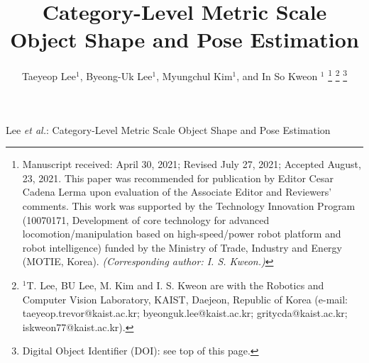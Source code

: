\documentclass[letterpaper, 10 pt, journal, twoside]{IEEEtran}
\begin{document}
\title{\LARGE \bf
Category-Level Metric Scale Object Shape and Pose Estimation}


\author{Taeyeop Lee$^{1}$, Byeong-Uk Lee$^{1}$, Myungchul Kim$^{1}$, and In So Kweon $^{1}$%
\thanks{
Manuscript received: April 30, 2021; Revised July 27, 2021; Accepted August, 23, 2021.
This paper was recommended for publication by Editor Cesar Cadena Lerma upon evaluation of the Associate Editor and 
Reviewers’ comments.
This work was supported by the Technology Innovation Program (10070171, Development of core technology for advanced locomotion/manipulation based on high-speed/power robot platform and robot intelligence) funded by the Ministry of Trade, Industry and Energy (MOTIE, Korea). \textit{(Corresponding author: I. S. Kweon.)}
}
\thanks{$^{1}$T. Lee, BU Lee, M. Kim and I. S. Kweon are with the Robotics and Computer Vision Laboratory, KAIST, Daejeon, Republic of Korea (e-mail: taeyeop.trevor@kaist.ac.kr; byeonguk.lee@kaist.ac.kr; gritycda@kaist.ac.kr; iskweon77@kaist.ac.kr).
}
\thanks{Digital Object Identifier (DOI): see top of this page.}
}


{Lee \MakeLowercase{\textit{et al.}}: Category-Level Metric Scale Object Shape and Pose Estimation}


\maketitle
\end{document}
